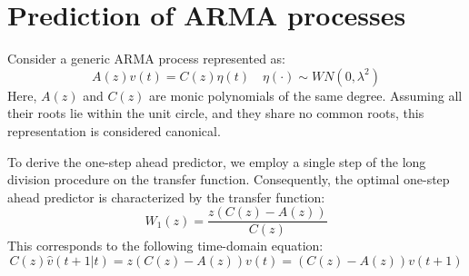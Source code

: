 \section{Prediction of ARMA processes}

Consider a generic ARMA process represented as:
\[A(z)v(t)=C(z)\eta(t) \quad \eta(\cdot)\sim WN(0,\lambda^2)\]
Here, $A(z)$ and $C(z)$ are monic polynomials of the same degree. 
Assuming all their roots lie within the unit circle, and they share no common roots, this representation is considered canonical.

To derive the one-step ahead predictor, we employ a single step of the long division procedure on the transfer function. 
Consequently, the optimal one-step ahead predictor is characterized by the transfer function:
\[W_1(z)=\dfrac{z\left( C(z)-A(z) \right)}{C(z)}\]
This corresponds to the following time-domain equation:
\[C(z)\hat{v}(t+1|t)=z\left( C(z)-A(z) \right)v(t)=\left( C(z)-A(z) \right)v(t+1)\]